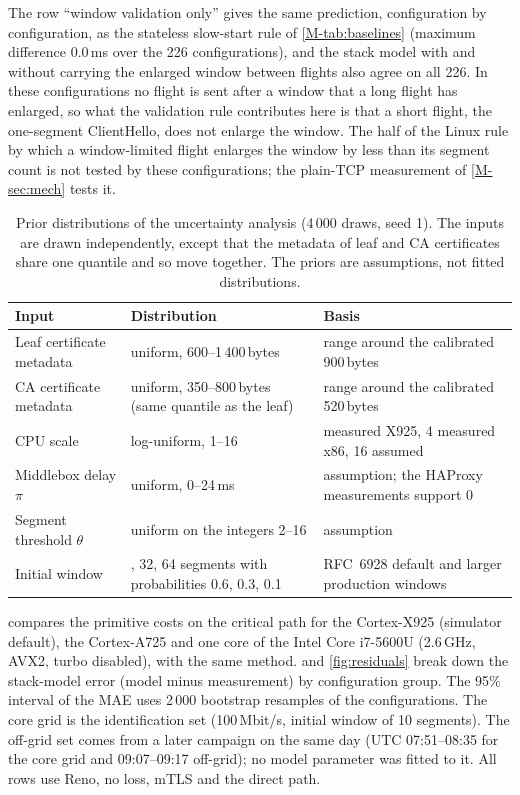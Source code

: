 \documentclass[preprint,12pt]{elsarticle}
\newcommand{\ms}{\,ms\xspace}
\newcommand{\Mbits}{\,Mbit/s\xspace}
\begin{document}
The row ``window validation only'' gives the same prediction, configuration by configuration, as the stateless slow-start rule of \cref{M-tab:baselines} (maximum difference 0.0\ms over the 226 configurations), and the stack model with and without carrying the enlarged window between flights also agree on all 226. In these configurations no flight is sent after a window that a long flight has enlarged, so what the validation rule contributes here is that a short flight, the one-segment ClientHello, does not enlarge the window. The half of the Linux rule by which a window-limited flight enlarges the window by less than its segment count is not tested by these configurations; the plain-TCP measurement of \cref{M-sec:mech} tests it.

\begin{table}[!htbp]\centering\small
\caption{Prior distributions of the uncertainty analysis (4\,000 draws, seed 1). The inputs are drawn independently, except that the metadata of leaf and CA certificates share one quantile and so move together. The priors are assumptions, not fitted distributions.}
\label{tab:priors}
\begin{tabularx}{\textwidth}{@{}>{\raggedright\arraybackslash}p{}>{\raggedright\arraybackslash}p{}>{\raggedright\arraybackslash}X@{}}
\toprule
Input & Distribution & Basis \\
\midrule
Leaf certificate metadata & uniform, 600--1\,400\,bytes & range around the calibrated 900\,bytes \\
CA certificate metadata & uniform, 350--800\,bytes (same quantile as the leaf) & range around the calibrated 520\,bytes \\
CPU scale & log-uniform, 1--16 & 1 measured X925, 4 measured x86, 16 assumed \\
Middlebox delay $\pi$ & uniform, 0--24\,ms & assumption; the HAProxy measurements support 0 \\
Segment threshold $\theta$ & uniform on the integers 2--16 & assumption \\
Initial window & 10, 32, 64 segments with probabilities 0.6, 0.3, 0.1 & RFC~6928 default and larger production windows \\
\bottomrule
\end{tabularx}
\end{table}

 compares the primitive costs on the critical path for the Cortex-X925 (simulator default), the Cortex-A725 and one core of the Intel Core i7-5600U (2.6\,GHz, AVX2, turbo disabled), with the same method.  and \cref{fig:residuals} break down the stack-model error (model minus measurement) by configuration group. The 95\% interval of the MAE uses 2\,000 bootstrap resamples of the configurations. The core grid is the identification set (100\Mbits, initial window of 10 segments). The off-grid set comes from a later campaign on the same day (UTC 07:51--08:35 for the core grid and 09:07--09:17 off-grid); no model parameter was fitted to it. All rows use Reno, no loss, mTLS and the direct path.
\end{document}
